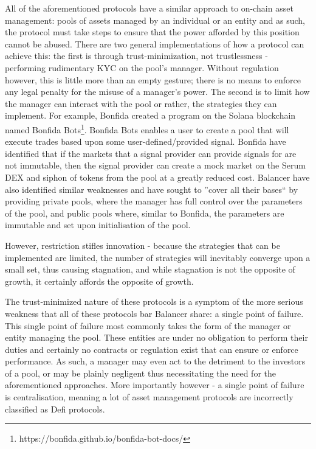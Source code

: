 \documentclass[10pt]{article}
\begin{document}
					All of the aforementioned protocols have a similar approach to on-chain
					asset management: pools of assets managed by an individual or an entity
					and as such, the protocol must take steps to ensure that the power
					afforded by this position cannot be abused. There are two general
					implementations of how a protocol can achieve this: the first is through
					trust-minimization, not trustlessness - performing rudimentary KYC on
					the pool's manager. Without regulation however, this is little more than
					an empty gesture; there is no means  to enforce any legal penalty for
					the misuse of a manager's power. The second is to limit how the manager
					can interact with the pool or rather, the strategies they can implement.
					For example, Bonfida created a program on the Solana blockchain named
					Bonfida Bots\footnote[6]{https://bonfida.github.io/bonfida-bot-docs/}.
					Bonfida Bots enables a user to create a pool that will execute trades
					based upon some user-defined/provided signal. Bonfida have identified
					that if the markets that a signal provider can provide signals for are
					not immutable, then the signal provider can create a mock market on the
					Serum DEX and siphon of tokens from the pool at a greatly reduced cost.
					Balancer have also identified similar weaknesses and have sought to
					''cover all their bases`` by providing private pools, where the manager
					has full control over the parameters of the pool, and public pools where,
					similar to Bonfida, the parameters are immutable and set upon
					initialisation of the pool.

					However, restriction stifles innovation - because the strategies that
					can be implemented are limited, the number of strategies will inevitably
					converge upon a small set, thus causing stagnation, and while stagnation
					is not the opposite of growth, it certainly affords the opposite of
					growth.

					The trust-minimized nature of these protocols is a symptom of the more
					serious weakness that all of these protocols bar Balancer share:
					a single point of failure. This single point of failure most commonly
					takes the form of the manager or entity managing the pool. These
					entities are under no obligation to perform their duties and certainly
					no contracts or regulation exist that can ensure or enforce performance.
					As such, a manager may even act to the detriment to the investors of
					a pool, or may be plainly negligent thus necessitating the need for the
					aforementioned approaches. More importantly however - a single point of
					failure is centralisation, meaning a lot of asset management protocols
					are incorrectly classified as Defi protocols.
\end{document}
